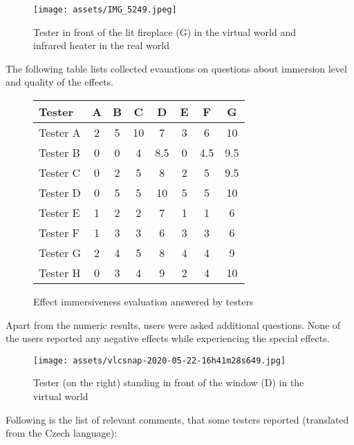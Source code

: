 \begin{figure}[h]{}
\centering\texttt{[image: assets/IMG\_5249.jpeg]}
\caption{Tester in front of the lit fireplace (G) in the virtual world and infrared heater in the real world}

\end{figure}

The following table lists collected evauations on questions about immersion level and
quality of the effects.

\begin{figure}[h]
    \begin{center}
    \begin{tabular}{|l|c|c|c|c|c|c|c|}
    \hline
    \textbf{Tester} & \textbf{A} & \textbf{B} & \textbf{C} & \textbf{D} & \textbf{E} & \textbf{F} & \textbf{G} \\ 
    \hline
    Tester A & 2 & 5 & 10 & 7 & 3 & 6 & 10 \\ 
    Tester B & 0 & 0 & 4 & 8.5 & 0 & 4.5 & 9.5 \\ 
    Tester C & 0 & 2 & 5 & 8 & 2 & 5 & 9.5 \\ 
    Tester D & 0 & 5 & 5 & 10 & 5 & 5 & 10 \\ 
    Tester E & 1 & 2 & 2 & 7 & 1 & 1 & 6 \\ 
    Tester F & 1 & 3 & 3 & 6 & 3 & 3 & 6 \\ 
    Tester G & 2 & 4 & 5 & 8 & 4 & 4 & 9 \\ 
    Tester H & 0 & 3 & 4 & 9 & 2 & 4 & 10 \\ 
    \hline
    \end{tabular}
    \caption{Effect immersiveness evaluation answered by testers}
    \end{center}
\end{figure}

Apart from the numeric results, users were asked additional questions.
None of the users reported any negative effects while experiencing the special
effects.


\begin{figure}[h]{}
\centering\texttt{[image: assets/vlcsnap-2020-05-22-16h41m28s649.jpg]}
\caption{Tester (on the right) standing in front of the window (D) in the virtual world}
\end{figure}

\pagebreak

Following is the list of relevant comments, that some testers reported
(translated from the Czech language):


